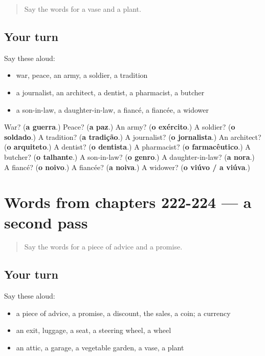 \begin{quote}
Say the words for a vase and a plant.
\end{quote}

\subsection*{Your turn}
Say these aloud:

\begin{itemize}
\raggedright
  \item war, peace, an army, a soldier, a tradition
  \item a journalist, an architect, a dentist, a pharmacist, a butcher
  \item a son-in-law, a daughter-in-law, a fiancé, a fiancée, a widower
\end{itemize}

\begin{tcolorbox}[breakable,colback=teal!4,colframe=teal!35!black,title={Before you move on}]
War? (\textbf{a guerra}.) Peace? (\textbf{a paz}.) An army? (\textbf{o exército}.) A soldier? (\textbf{o soldado}.) A tradition? (\textbf{a tradição}.) A journalist? (\textbf{o jornalista}.) An architect? (\textbf{o arquiteto}.) A dentist? (\textbf{o dentista}.) A pharmacist? (\textbf{o farmacêutico}.) A butcher? (\textbf{o talhante}.) A son-in-law? (\textbf{o genro}.) A daughter-in-law? (\textbf{a nora}.) A fiancé? (\textbf{o noivo}.) A fiancée? (\textbf{a noiva}.) A widower? (\textbf{o viúvo / a viúva}.)
\end{tcolorbox}
\section[(dialogue)]{Words from chapters 222-224 — a second pass}

\label{lesson:PT-R224-second-pass-words-from-chapters-222-224}



\begin{quote}
Say the words for a piece of advice and a promise.
\end{quote}

\subsection*{Your turn}
Say these aloud:

\begin{itemize}
\raggedright
  \item a piece of advice, a promise, a discount, the sales, a coin; a currency
  \item an exit, luggage, a seat, a steering wheel, a wheel
  \item an attic, a garage, a vegetable garden, a vase, a plant
\end{itemize}

